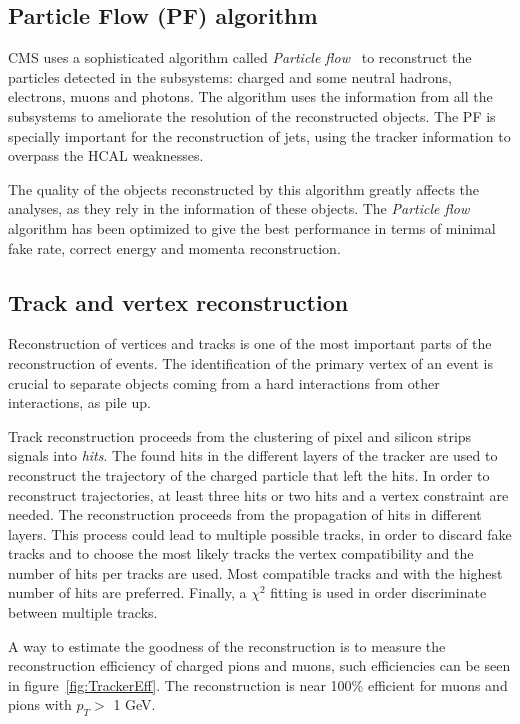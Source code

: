 \subsection{Particle Flow (PF) algorithm}

CMS uses a sophisticated algorithm called \textit{Particle flow}~\cite{CMS:2009nxa,CMS:2010eua,CMS:2010byl,CMS:2010aua} to reconstruct the particles detected in the subsystems: charged and some neutral hadrons, electrons, muons and photons. The algorithm uses the information from all the subsystems to ameliorate the resolution of the reconstructed objects. The PF is specially important for the reconstruction of jets, using the tracker information to overpass the HCAL weaknesses. 

The quality of the objects reconstructed by this algorithm greatly affects the analyses, as they rely in the information of these objects. The \textit{Particle flow} algorithm has been optimized to give the best performance in terms of minimal fake rate, correct energy and momenta reconstruction. 

\subsection{Track and vertex reconstruction}

Reconstruction of vertices and tracks is one of the most important parts of the reconstruction of events. The identification of the primary vertex of an event is crucial to separate objects coming from a hard interactions from other interactions, as pile up. 

Track reconstruction proceeds from the clustering of pixel and silicon strips signals into \textit{hits}. The found hits in the different layers of the tracker are used to reconstruct the trajectory of the charged particle that left the hits. In order to reconstruct trajectories, at least three hits or two hits and a vertex constraint are needed. The reconstruction proceeds from the propagation of hits in different layers. This process could lead to multiple possible tracks, in order to discard fake tracks and to choose the most likely tracks the vertex compatibility and the number of hits per tracks are used. Most compatible tracks and with the highest number of hits are preferred. Finally, a $\chi^{2}$ fitting is used in order discriminate between multiple tracks. 

A way to estimate the goodness of the reconstruction is to measure the reconstruction efficiency of charged pions and muons, such efficiencies can be seen in figure~\ref{fig:TrackerEff}. The reconstruction is near 100\% efficient for muons and pions with $p_{T}>$ 1 GeV.

